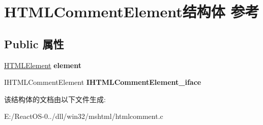 \hypertarget{struct_h_t_m_l_comment_element}{}\section{H\+T\+M\+L\+Comment\+Element结构体 参考}
\label{struct_h_t_m_l_comment_element}
\subsection*{Public 属性}
\begin{DoxyCompactItemize}
\item 
\mbox{\label{struct_h_t_m_l_comment_element_a475656b1f1d7503b6ef4d149f6e3c550}} 
\hyperlink{struct_h_t_m_l_element}{H\+T\+M\+L\+Element} {\bfseries element}
\item 
\mbox{\label{struct_h_t_m_l_comment_element_aa409a8a00bd1675a1de1dfbd90d9a499}} 
I\+H\+T\+M\+L\+Comment\+Element {\bfseries I\+H\+T\+M\+L\+Comment\+Element\+\_\+iface}
\end{DoxyCompactItemize}


该结构体的文档由以下文件生成\+:\begin{DoxyCompactItemize}
\item 
E\+:/\+React\+O\+S-\/0../dll/win32/mshtml/htmlcomment.\+c\end{DoxyCompactItemize}
